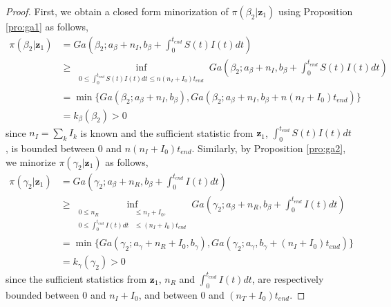 \documentclass[12pt]{article}
\begin{document}
\begin{proof}
		First, we obtain a closed form minorization of $\pi(\beta_2| \mathbf{z}_1)$ using Proposition \ref{pro:ga1} as follows,
		\begin{align*}
			\pi(\beta_2| \mathbf{z}_1) 
			& = Ga\left(\beta_2; a_{\beta} + n_I, b_{\beta} + \int_{0}^{t_{end}}S(t)I(t)dt\right) \\
			& \ge \inf_{\begin{aligned}
					0\le \int_{0}^{t_{end}} S(t)I(t)dt \le n(n_I+I_0) t_{end}
			\end{aligned}}   Ga\left(\beta_2; a_{\beta} + n_I, b_{\beta} + \int_{0}^{t_{end}}S(t)I(t)dt\right) \\
			& = \min\{Ga(\beta_2;a_{\beta}+n_I, b_{\beta}), Ga(\beta_2;a_{\beta}+n_I,b_{\beta}+n(n_I+I_0) t_{end})\} \\
			& = k_\beta(\beta_2) > 0
		\end{align*}
		since $n_I = \sum_k I_k$ is known and the sufficient statistic from $\mathbf{z}_1$, 
		$\int_{0}^{t_{end}}S(t)I(t)dt$, is bounded between $0$ and $n (n_I+I_0)t_{end}$. Similarly, by Proposition \ref{pro:ga2}, we minorize $\pi(\gamma_2| \mathbf{z}_1)$ as follows,
		\begin{align*}
			\pi(\gamma_2| \mathbf{z}_1) 
			& = Ga\left(\gamma_2; a_{\beta} + n_R, b_{\beta} + \int_{0}^{t_{end}}I(t)dt\right)  \\
			& \ge \inf_{\begin{aligned}
					0 \le n_R &\le n_I + I_0, \\
					0 \le \int_{0}^{t_{end}} I(t)dt &\le (n_I+I_0) t_{end}
			\end{aligned}} Ga\left(\gamma_2; a_{\beta} + n_R, b_{\beta} + \int_{0}^{t_{end}}I(t)dt\right) \\
			& = \min\{		Ga(\gamma_2;a_{\gamma}+n_R+I_0,b_{\gamma}), Ga(\gamma_2;a_{\gamma},b_{\gamma}+(n_I+I_0) t_{end})\} \\
			& = k_\gamma(\gamma_2) > 0
		\end{align*}
		since the sufficient statistics from $\mathbf{z}_1$, $n_R$ and $\int_{0}^{t_{end}}I(t)dt$, are respectively bounded between $0$ and $n_I + I_0$, and between $0$ and $(n_T+I_0) t_{end}$.
		

\end{proof}
\end{document}
